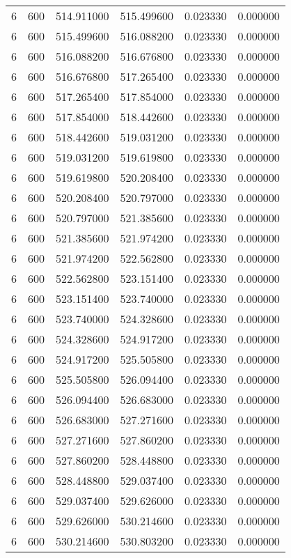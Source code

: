 \begin{longtable}{rrrrrr}
6 & 600 & 514.911000 & 515.499600 & 0.023330 & 0.000000 \\
6 & 600 & 515.499600 & 516.088200 & 0.023330 & 0.000000 \\
6 & 600 & 516.088200 & 516.676800 & 0.023330 & 0.000000 \\
6 & 600 & 516.676800 & 517.265400 & 0.023330 & 0.000000 \\
6 & 600 & 517.265400 & 517.854000 & 0.023330 & 0.000000 \\
6 & 600 & 517.854000 & 518.442600 & 0.023330 & 0.000000 \\
6 & 600 & 518.442600 & 519.031200 & 0.023330 & 0.000000 \\
6 & 600 & 519.031200 & 519.619800 & 0.023330 & 0.000000 \\
6 & 600 & 519.619800 & 520.208400 & 0.023330 & 0.000000 \\
6 & 600 & 520.208400 & 520.797000 & 0.023330 & 0.000000 \\
6 & 600 & 520.797000 & 521.385600 & 0.023330 & 0.000000 \\
6 & 600 & 521.385600 & 521.974200 & 0.023330 & 0.000000 \\
6 & 600 & 521.974200 & 522.562800 & 0.023330 & 0.000000 \\
6 & 600 & 522.562800 & 523.151400 & 0.023330 & 0.000000 \\
6 & 600 & 523.151400 & 523.740000 & 0.023330 & 0.000000 \\
6 & 600 & 523.740000 & 524.328600 & 0.023330 & 0.000000 \\
6 & 600 & 524.328600 & 524.917200 & 0.023330 & 0.000000 \\
6 & 600 & 524.917200 & 525.505800 & 0.023330 & 0.000000 \\
6 & 600 & 525.505800 & 526.094400 & 0.023330 & 0.000000 \\
6 & 600 & 526.094400 & 526.683000 & 0.023330 & 0.000000 \\
6 & 600 & 526.683000 & 527.271600 & 0.023330 & 0.000000 \\
6 & 600 & 527.271600 & 527.860200 & 0.023330 & 0.000000 \\
6 & 600 & 527.860200 & 528.448800 & 0.023330 & 0.000000 \\
6 & 600 & 528.448800 & 529.037400 & 0.023330 & 0.000000 \\
6 & 600 & 529.037400 & 529.626000 & 0.023330 & 0.000000 \\
6 & 600 & 529.626000 & 530.214600 & 0.023330 & 0.000000 \\
6 & 600 & 530.214600 & 530.803200 & 0.023330 & 0.000000 \\

\end{longtable}
